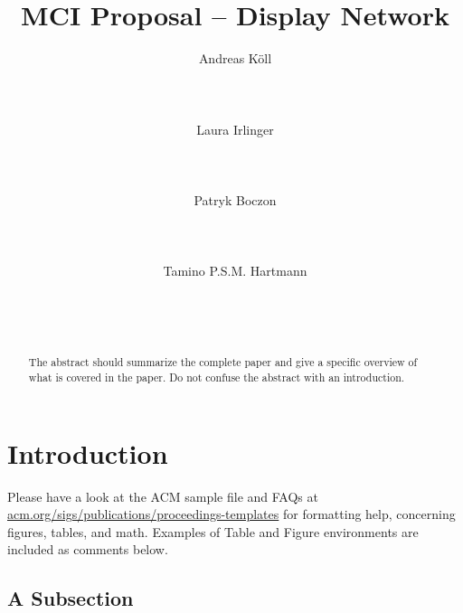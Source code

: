 \documentclass{acm_proc_article-sp}
\begin{document}
\title{MCI Proposal – Display Network}

\author{
\alignauthor
Andreas Köll\\
       \\
       \\
       \\
\alignauthor
Laura Irlinger\\
       \\
       \\
       \\
\alignauthor
Patryk Boczon\\
       \\
       \\
       \\
\alignauthor
Tamino P.S.M. Hartmann\\
       \\
       \\
       \\
}

\maketitle
\begin{abstract}
The abstract should summarize the complete paper and give a specific overview of what is covered in the paper. Do not confuse the abstract with an introduction.
\end{abstract}

\section{Introduction}
Please have a look at the ACM sample file and FAQs at \url{acm.org/sigs/publications/proceedings-templates} for formatting help, concerning figures, tables, and math. Examples of Table and Figure environments are included as comments below.

\subsection{A Subsection}
\end{document}
